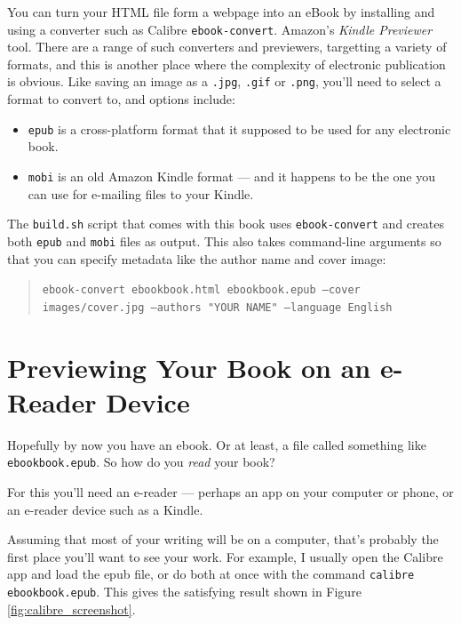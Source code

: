 You can turn your HTML file form a webpage into an eBook by installing
and using a converter such as Calibre \texttt{ebook-convert}.
Amazon's {\em Kindle Previewer} tool.
There are a range of such converters and previewers, targetting a
variety of formats, and this is another place where the complexity of
electronic publication is obvious. Like saving an image as a
\texttt{.jpg}, \texttt{.gif} or \texttt{.png}, you'll need to select a
format to convert to, and options include:

\begin{itemize}
  \item \texttt{epub} is a cross-platform format that it supposed to
    be used for any electronic book.
  \item \texttt{mobi} is an old Amazon Kindle format --- and it
    happens to be the one you can use for e-mailing files to your Kindle.
\end{itemize}

The \texttt{build.sh} script that comes with this book uses
\texttt{ebook-convert} and creates both \texttt{epub} and
\texttt{mobi} files as output. This also takes command-line
arguments so that you can specify metadata like the author name
and cover image:

\begin{quote}
\footnotesize
\flushleft
\texttt{ebook-convert ebookbook.html ebookbook.epub --cover images/cover.jpg --authors "YOUR NAME" --language English}
\end{quote}

\section{Previewing Your Book on an e-Reader Device}

Hopefully by now you have an ebook. Or at least, a file called something like
\texttt{ebookbook.epub}. So how do you {\em read} your book?

For this you'll need an e-reader --- perhaps an app on your computer or phone,
or an e-reader device such as a Kindle.

Assuming that most of your writing will be on a computer, that's
probably the first place you'll want to see your work. For example, I
usually open the Calibre app and load the epub file, or do both at
once with the command \texttt{calibre ebookbook.epub}. This gives 
the satisfying result shown in Figure \ref{fig:calibre_screenshot}.

